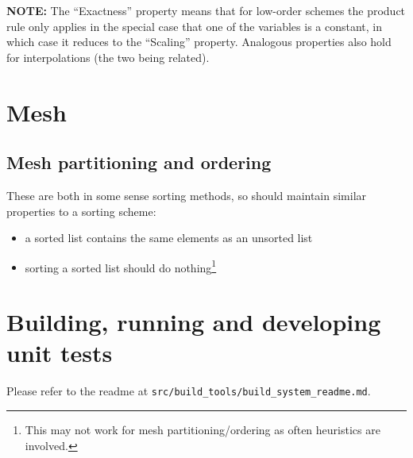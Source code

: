 \documentclass[11pt]{report}
\begin{document}
\textbf{NOTE:} The ``Exactness'' property means that for low-order schemes the product rule only applies
in the special case that one of the variables is a constant, in which case it reduces to the
``Scaling'' property.
Analogous properties also hold for interpolations (the two being related).

\section{Mesh}

\subsection{Mesh partitioning and ordering}

These are both in some sense sorting methods, so should maintain similar properties to a sorting
scheme:
\begin{itemize}
\item a sorted list contains the same elements as an unsorted list
\item sorting a sorted list should do nothing\footnote{This may not work for mesh
    partitioning/ordering as often heuristics are involved.}
\end{itemize}

\section{Building, running and developing unit tests}
\label{sec:build-runn-unit}

Please refer to the readme at \texttt{src/build\_tools/build\_system\_readme.md}. 
\end{document}
